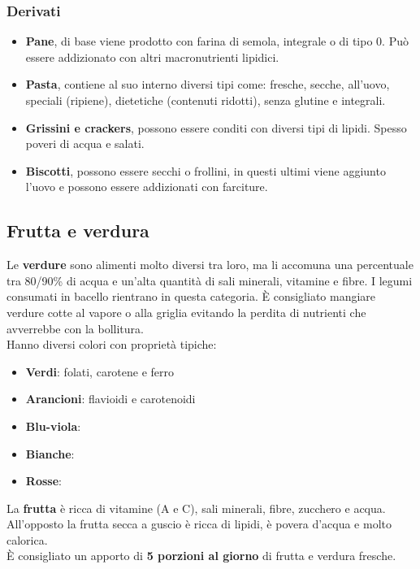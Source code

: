 \documentclass[10pt]{article}
\begin{document}
\subsubsection{Derivati}
\begin{itemize}
\item\textbf{Pane}, di base viene prodotto con farina di semola, integrale o di tipo 0. Può essere addizionato con altri macronutrienti lipidici.
\item\textbf{Pasta}, contiene al suo interno diversi tipi come: fresche, secche, all'uovo, speciali (ripiene), dietetiche (contenuti ridotti), senza glutine e integrali.
\item\textbf{Grissini e crackers}, possono essere conditi con diversi tipi di lipidi. Spesso poveri di acqua e salati. 
\item\textbf{Biscotti}, possono essere secchi o frollini, in questi ultimi viene aggiunto l'uovo e possono essere addizionati con farciture.
\end{itemize}
\subsection{Frutta e verdura}
Le \textbf{verdure} sono alimenti molto diversi tra loro, ma li accomuna una percentuale tra 80/90\% di acqua e un'alta quantità di sali minerali, vitamine e fibre. I legumi consumati in bacello rientrano in questa categoria. È consigliato mangiare verdure cotte al vapore o alla griglia evitando la perdita di nutrienti che avverrebbe con la bollitura.\\
Hanno diversi colori con proprietà tipiche:
\begin{itemize}
\item \textbf{Verdi}: folati, carotene e ferro
\item \textbf{Arancioni}: flavioidi e carotenoidi
\item \textbf{Blu-viola}:
\item \textbf{Bianche}:
\item \textbf{Rosse}:
\end{itemize}
La \textbf{frutta} è ricca di vitamine (A e C), sali minerali, fibre, zucchero e acqua. All'opposto la frutta secca a guscio è ricca di lipidi, è povera d'acqua e molto calorica.\\
È consigliato un apporto di \textbf{5 porzioni al giorno} di frutta e verdura fresche.  
\end{document}
